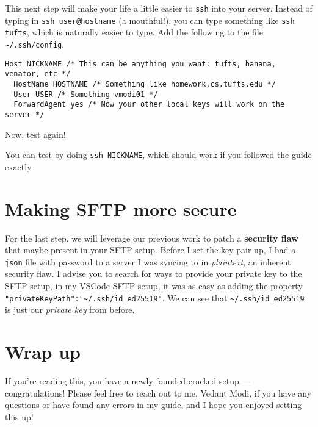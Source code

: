 \documentclass[12pt]{article}
\begin{document}
This next step will make your life a little easier to \texttt{ssh} into your
server. Instead of typing in \verb|ssh user@hostname| (a mouthful!), you can
type something like \texttt{ssh tufts}, which is naturally easier to type. Add
the following to the file \verb|~/.ssh/config|. 

\begin{verbatim}
Host NICKNAME /* This can be anything you want: tufts, banana, venator, etc */
  HostName HOSTNAME /* Something like homework.cs.tufts.edu */
  User USER /* Something vmodi01 */
  ForwardAgent yes /* Now your other local keys will work on the server */
\end{verbatim}

Now, test again!

You can test by doing \verb|ssh NICKNAME|, which should work if you followed
the guide exactly.

\section{Making SFTP more secure}

For the last step, we will leverage our previous work to patch a
\textbf{security flaw} that maybe present in your SFTP setup. Before I set the
key-pair up, I had a \texttt{json} file with password to a server I was syncing
to in \textit{plaintext}, an inherent security flaw. I advise you to search for
ways to provide your private key to the SFTP setup, in my VSCode SFTP setup, it
was as easy as adding the property \verb|"privateKeyPath":"~/.ssh/id_ed25519"|. 
We can see that \verb|~/.ssh/id_ed25519| is just our \textit{private key} from
before.

\section{Wrap up}

If you're reading this, you have a newly founded cracked setup —
congratulations! Please feel free to reach out to me, Vedant Modi, if you have
any questions or have found any errors in my guide, and I hope you enjoyed
setting this up! 
\end{document}
